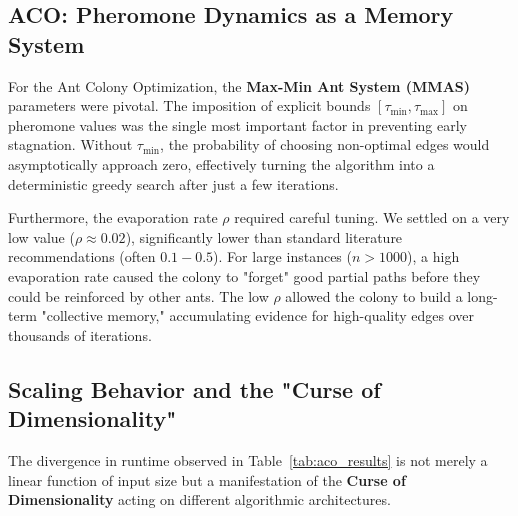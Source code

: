 \documentclass[11pt,a4paper]{article}
\begin{document}
\subsection{ACO: Pheromone Dynamics as a Memory System}
For the Ant Colony Optimization, the \textbf{Max-Min Ant System (MMAS)} parameters were pivotal. The imposition of explicit bounds $[\tau_{\min}, \tau_{\max}]$ on pheromone values was the single most important factor in preventing early stagnation. Without $\tau_{\min}$, the probability of choosing non-optimal edges would asymptotically approach zero, effectively turning the algorithm into a deterministic greedy search after just a few iterations.

Furthermore, the evaporation rate $\rho$ required careful tuning. We settled on a very low value ($\rho \approx 0.02$), significantly lower than standard literature recommendations (often $0.1 - 0.5$). For large instances ($n > 1000$), a high evaporation rate caused the colony to "forget" good partial paths before they could be reinforced by other ants. The low $\rho$ allowed the colony to build a long-term "collective memory," accumulating evidence for high-quality edges over thousands of iterations.

\subsection{Scaling Behavior and the "Curse of Dimensionality"}
The divergence in runtime observed in Table~\ref{tab:aco_results} is not merely a linear function of input size but a manifestation of the \textbf{Curse of Dimensionality} acting on different algorithmic architectures.
\end{document}
